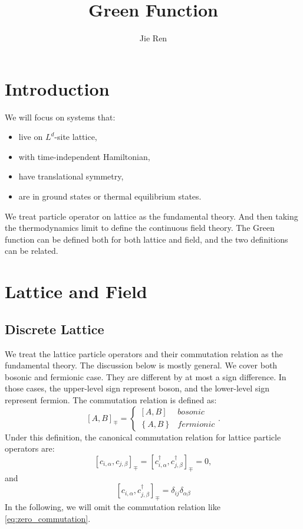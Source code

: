 \documentclass[journal=jacsat,manuscript=article]{achemso}
\author{Jie Ren}
\title{Green Function}
\begin{document}
\section{Introduction}
We will focus on systems that:
\begin{itemize}
\item live on $L^{d}$-site lattice,
\item with time-independent Hamiltonian,
\item have translational symmetry,
\item are in ground states or thermal equilibrium states.
\end{itemize}
We treat particle operator on lattice as the fundamental theory. And
then taking the thermodynamics limit to define the continuous field
theory. The Green function can be defined both for both lattice and
field, and the two definitions can be related.

\section{Lattice and Field}

\subsection{Discrete Lattice}

We treat the lattice particle operators and their commutation relation as the fundamental theory. The discussion below is mostly general. We cover both bosonic and fermionic case. They are different by at most a sign difference. In those cases, the upper-level sign represent boson, and the lower-level sign represent fermion. The commutation relation is defined as:
\begin{equation}
	\left[A,B\right]_{\mp}=\begin{cases}
	\left[A,B\right] & bosonic\\
	\left\{ A,B\right\}  & fermionic
	\end{cases}.
\end{equation}
Under this definition, the canonical commutation relation for lattice particle operators are:
\begin{equation}
	\left[c_{i,\alpha},c_{j,\beta}\right]_{\mp}
	=\left[c_{i,\alpha}^{\dagger},c_{j,\beta}^{\dagger}\right]_{\mp}=0,
	\label{eq:zero_commutation}
\end{equation}
and
\begin{equation}
	\left[c_{i,\alpha},c_{j,\beta}^{\dagger}\right]_{\mp}
	=\delta_{ij}\delta_{\alpha\beta}
\end{equation}
In the following, we will omit the commutation relation like \eqref{eq:zero_commutation}. 
\end{document}
